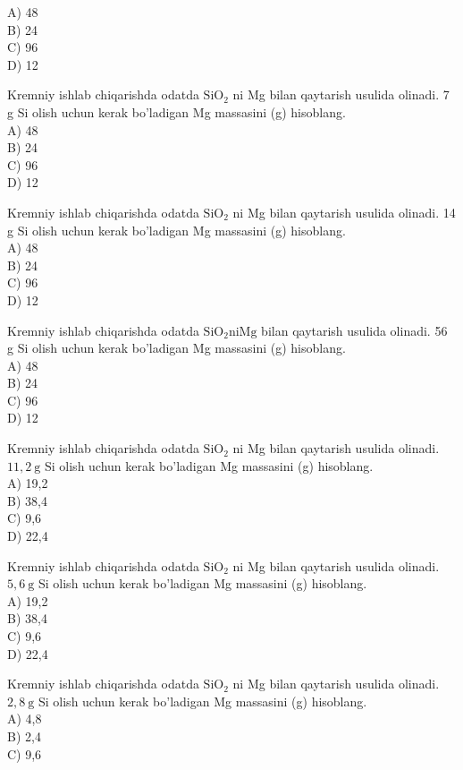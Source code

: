 A) 48\\
B) 24\\
C) 96\\
D) 12
  \item Kremniy ishlab chiqarishda odatda $\mathrm{SiO}_{2}$ ni Mg bilan qaytarish usulida olinadi. 7 g Si olish uchun kerak bo'ladigan Mg massasini (g) hisoblang.\\
A) 48\\
B) 24\\
C) 96\\
D) 12
  \item Kremniy ishlab chiqarishda odatda $\mathrm{SiO}_{2}$ ni Mg bilan qaytarish usulida olinadi. 14 g Si olish uchun kerak bo'ladigan Mg massasini (g) hisoblang.\\
A) 48\\
B) 24\\
C) 96\\
D) 12
  \item Kremniy ishlab chiqarishda odatda $\mathrm{SiO}_{2} \mathrm{ni} \mathrm{Mg}$ bilan qaytarish usulida olinadi. 56 g Si olish uchun kerak bo'ladigan Mg massasini (g) hisoblang.\\
A) 48\\
B) 24\\
C) 96\\
D) 12
  \item Kremniy ishlab chiqarishda odatda $\mathrm{SiO}_{2}$ ni Mg bilan qaytarish usulida olinadi. $11,2 \mathrm{~g}$ Si olish uchun kerak bo'ladigan Mg massasini (g) hisoblang.\\
A) 19,2\\
B) 38,4\\
C) 9,6\\
D) 22,4
  \item Kremniy ishlab chiqarishda odatda $\mathrm{SiO}_{2}$ ni Mg bilan qaytarish usulida olinadi. $5,6 \mathrm{~g}$ Si olish uchun kerak bo'ladigan Mg massasini (g) hisoblang.\\
A) 19,2\\
B) 38,4\\
C) 9,6\\
D) 22,4
  \item Kremniy ishlab chiqarishda odatda $\mathrm{SiO}_{2}$ ni Mg bilan qaytarish usulida olinadi. $2,8 \mathrm{~g}$ Si olish uchun kerak bo'ladigan Mg massasini (g) hisoblang.\\
A) 4,8\\
B) 2,4\\
C) 9,6\\
